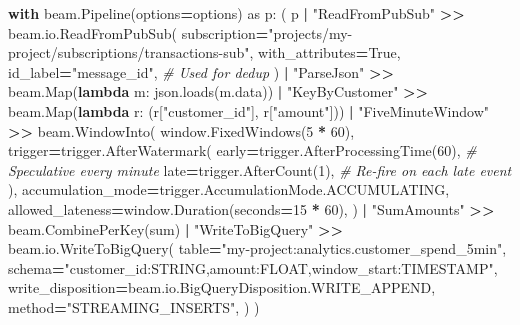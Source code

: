 \documentclass[
  11pt,
  british,
  oneside]{book}
\newenvironment{Shaded}{\begin{snugshade}}{\end{snugshade}}
\newcommand{\BuiltInTok}[1]{#1}
\newcommand{\CommentTok}[1]{\textcolor[rgb]{0.56,0.35,0.01}{\textit{#1}}}
\newcommand{\ControlFlowTok}[1]{\textcolor[rgb]{0.13,0.29,0.53}{\textbf{#1}}}
\newcommand{\DecValTok}[1]{\textcolor[rgb]{0.00,0.00,0.81}{#1}}
\newcommand{\ImportTok}[1]{#1}
\newcommand{\KeywordTok}[1]{\textcolor[rgb]{0.13,0.29,0.53}{\textbf{#1}}}
\newcommand{\NormalTok}[1]{#1}
\newcommand{\OperatorTok}[1]{\textcolor[rgb]{0.81,0.36,0.00}{\textbf{#1}}}
\newcommand{\StringTok}[1]{\textcolor[rgb]{0.31,0.60,0.02}{#1}}
\newcommand{\VariableTok}[1]{\textcolor[rgb]{0.00,0.00,0.00}{#1}}
\begin{document}
\begin{Shaded}
\begin{Highlighting}[]
\ControlFlowTok{with}\NormalTok{ beam.Pipeline(options}\OperatorTok{=}\NormalTok{options) }\ImportTok{as}\NormalTok{ p:}
\NormalTok{    (}
\NormalTok{        p}
        \OperatorTok{|} \StringTok{"ReadFromPubSub"} \OperatorTok{\textgreater{}\textgreater{}}\NormalTok{ beam.io.ReadFromPubSub(}
\NormalTok{            subscription}\OperatorTok{=}\StringTok{"projects/my{-}project/subscriptions/transactions{-}sub"}\NormalTok{,}
\NormalTok{            with\_attributes}\OperatorTok{=}\VariableTok{True}\NormalTok{,}
\NormalTok{            id\_label}\OperatorTok{=}\StringTok{"message\_id"}\NormalTok{,  }\CommentTok{\# Used for dedup}
\NormalTok{        )}
        \OperatorTok{|} \StringTok{"ParseJson"} \OperatorTok{\textgreater{}\textgreater{}}\NormalTok{ beam.Map(}\KeywordTok{lambda}\NormalTok{ m: json.loads(m.data))}
        \OperatorTok{|} \StringTok{"KeyByCustomer"} \OperatorTok{\textgreater{}\textgreater{}}\NormalTok{ beam.Map(}\KeywordTok{lambda}\NormalTok{ r: (r[}\StringTok{"customer\_id"}\NormalTok{], r[}\StringTok{"amount"}\NormalTok{]))}
        \OperatorTok{|} \StringTok{"FiveMinuteWindow"} \OperatorTok{\textgreater{}\textgreater{}}\NormalTok{ beam.WindowInto(}
\NormalTok{            window.FixedWindows(}\DecValTok{5} \OperatorTok{*} \DecValTok{60}\NormalTok{),}
\NormalTok{            trigger}\OperatorTok{=}\NormalTok{trigger.AfterWatermark(}
\NormalTok{                early}\OperatorTok{=}\NormalTok{trigger.AfterProcessingTime(}\DecValTok{60}\NormalTok{),  }\CommentTok{\# Speculative every minute}
\NormalTok{                late}\OperatorTok{=}\NormalTok{trigger.AfterCount(}\DecValTok{1}\NormalTok{),             }\CommentTok{\# Re{-}fire on each late event}
\NormalTok{            ),}
\NormalTok{            accumulation\_mode}\OperatorTok{=}\NormalTok{trigger.AccumulationMode.ACCUMULATING,}
\NormalTok{            allowed\_lateness}\OperatorTok{=}\NormalTok{window.Duration(seconds}\OperatorTok{=}\DecValTok{15} \OperatorTok{*} \DecValTok{60}\NormalTok{),}
\NormalTok{        )}
        \OperatorTok{|} \StringTok{"SumAmounts"} \OperatorTok{\textgreater{}\textgreater{}}\NormalTok{ beam.CombinePerKey(}\BuiltInTok{sum}\NormalTok{)}
        \OperatorTok{|} \StringTok{"WriteToBigQuery"} \OperatorTok{\textgreater{}\textgreater{}}\NormalTok{ beam.io.WriteToBigQuery(}
\NormalTok{            table}\OperatorTok{=}\StringTok{"my{-}project:analytics.customer\_spend\_5min"}\NormalTok{,}
\NormalTok{            schema}\OperatorTok{=}\StringTok{"customer\_id:STRING,amount:FLOAT,window\_start:TIMESTAMP"}\NormalTok{,}
\NormalTok{            write\_disposition}\OperatorTok{=}\NormalTok{beam.io.BigQueryDisposition.WRITE\_APPEND,}
\NormalTok{            method}\OperatorTok{=}\StringTok{"STREAMING\_INSERTS"}\NormalTok{,}
\NormalTok{        )}
\NormalTok{    )}
\end{Highlighting}
\end{Shaded}
\end{document}

